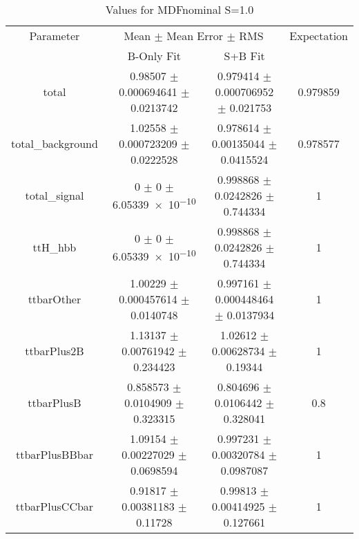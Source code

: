 \begin{table}
\centering
\caption{Values for MDFnominal S=1.0}
\begin{tabular}{cccc}
\toprule
Parameter & \multicolumn{2}{c}{Mean $\pm$ Mean Error $\pm$ RMS} & Expectation\\
 & B-Only Fit & S+B Fit & \\
\midrule
total & \num{0.98507} $\pm$ \num{0.000694641} $\pm$ \num{0.0213742} & \num{0.979414} $\pm$ \num{0.000706952} $\pm$ \num{0.021753} & \num{0.979859}\\
total\_background & \num{1.02558} $\pm$ \num{0.000723209} $\pm$ \num{0.0222528} & \num{0.978614} $\pm$ \num{0.00135044} $\pm$ \num{0.0415524} & \num{0.978577}\\
total\_signal & \num{0} $\pm$ \num{0} $\pm$ \num{6.05339e-10} & \num{0.998868} $\pm$ \num{0.0242826} $\pm$ \num{0.744334} & \num{1}\\
ttH\_hbb & \num{0} $\pm$ \num{0} $\pm$ \num{6.05339e-10} & \num{0.998868} $\pm$ \num{0.0242826} $\pm$ \num{0.744334} & \num{1}\\
ttbarOther & \num{1.00229} $\pm$ \num{0.000457614} $\pm$ \num{0.0140748} & \num{0.997161} $\pm$ \num{0.000448464} $\pm$ \num{0.0137934} & \num{1}\\
ttbarPlus2B & \num{1.13137} $\pm$ \num{0.00761942} $\pm$ \num{0.234423} & \num{1.02612} $\pm$ \num{0.00628734} $\pm$ \num{0.19344} & \num{1}\\
ttbarPlusB & \num{0.858573} $\pm$ \num{0.0104909} $\pm$ \num{0.323315} & \num{0.804696} $\pm$ \num{0.0106442} $\pm$ \num{0.328041} & \num{0.8}\\
ttbarPlusBBbar & \num{1.09154} $\pm$ \num{0.00227029} $\pm$ \num{0.0698594} & \num{0.997231} $\pm$ \num{0.00320784} $\pm$ \num{0.0987087} & \num{1}\\
ttbarPlusCCbar & \num{0.91817} $\pm$ \num{0.00381183} $\pm$ \num{0.11728} & \num{0.99813} $\pm$ \num{0.00414925} $\pm$ \num{0.127661} & \num{1}\\
\bottomrule
\end{tabular}
\end{table}
